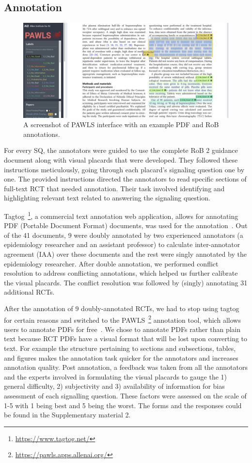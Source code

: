 \documentclass[sn-mathphys,Numbered]{sn-jnl}%
\theoremstyle{thmstyleone}%
\theoremstyle{thmstyletwo}%
\theoremstyle{thmstylethree}%
\begin{document}
\subsection{Annotation}
\label{annotation}
%
%
%
%
\begin{figure}[htb]
    \centering
    \includegraphics[width=0.80\columnwidth]{figures/pawls_layout.png}
    \caption{A screenshot of PAWLS interface with an example PDF and RoB annotations.}
    \label{fig:pawls}
\end{figure}
%
%
%
For every SQ, the annotators were guided to use the complete RoB 2 guidance document along with visual placards that were developed.
They followed these instructions meticulously, going through each placard's signaling question one by one.
The provided instructions directed the annotators to read specific sections of full-text RCT that needed annotation.
Their task involved identifying and highlighting relevant text related to answering the signaling question.



Tagtog~\footnote{\url{https://www.tagtog.net/}}, a commercial text annotation web application, allows for annotating PDF (Portable Document Format) documents, was used for the annotation~\cite{cejuela2014tagtog}.
Out of the 41 documents, 9 were doubly annotated by two experienced annotators (a epidemiology researcher and an assistant professor) to calculate inter-annotator agreement (IAA) over these documents and the rest were singly annotated by the epidemiology researcher.
After double annotation, we performed conflict resolution to address conflicting annotations, which helped us further calibrate the visual placards.
The conflict resolution was followed by (singly) annotating 31 additional RCTs.


After the annotation of 9 doubly-annotated RCTs, we had to stop using tagtog for certain reasons and switched to the PAWLS~\footnote{\url{https://pawls.apps.allenai.org/}} annotation tool, which allows users to annotate PDFs for free~\cite{neumann2021pawls}.
We chose to annotate PDFs rather than plain text because RCT PDFs have a visual format that will be lost upon converting to text. 
For example the structure pertaining to sections and subsections, tables, and figures makes the annotation task quicker for the annotators and increases annotation quality.
Post annotation, a feedback was taken from all the annotators and the experts involved in formulating the visual placards to gauge the 1) general difficulty, 2) subjectivity and 3) availability of information for bias assessment of each signalling question.
These factors were assessed on the scale of 1-5 with 1 being best and 5 being the worst.
The forms and the responses could be found in the Supplementary material 2. %
%
%
%
\end{document}
